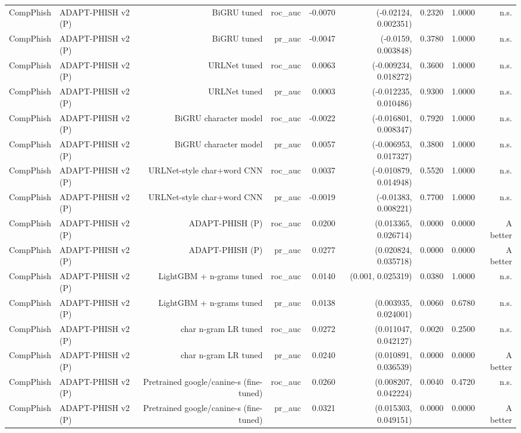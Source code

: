 \begin{table}[t]
\begin{tabular}{llrrrrrrr}
CompPhish & ADAPT-PHISH v2 (P) & BiGRU tuned & roc\_auc & -0.0070 & (-0.02124, 0.002351) & 0.2320 & 1.0000 & n.s. \\
CompPhish & ADAPT-PHISH v2 (P) & BiGRU tuned & pr\_auc & -0.0047 & (-0.0159, 0.003848) & 0.3780 & 1.0000 & n.s. \\
CompPhish & ADAPT-PHISH v2 (P) & URLNet tuned & roc\_auc & 0.0063 & (-0.009234, 0.018272) & 0.3600 & 1.0000 & n.s. \\
CompPhish & ADAPT-PHISH v2 (P) & URLNet tuned & pr\_auc & 0.0003 & (-0.012235, 0.010486) & 0.9300 & 1.0000 & n.s. \\
CompPhish & ADAPT-PHISH v2 (P) & BiGRU character model & roc\_auc & -0.0022 & (-0.016801, 0.008347) & 0.7920 & 1.0000 & n.s. \\
CompPhish & ADAPT-PHISH v2 (P) & BiGRU character model & pr\_auc & 0.0057 & (-0.006953, 0.017327) & 0.3800 & 1.0000 & n.s. \\
CompPhish & ADAPT-PHISH v2 (P) & URLNet-style char+word CNN & roc\_auc & 0.0037 & (-0.010879, 0.014948) & 0.5520 & 1.0000 & n.s. \\
CompPhish & ADAPT-PHISH v2 (P) & URLNet-style char+word CNN & pr\_auc & -0.0019 & (-0.01383, 0.008221) & 0.7700 & 1.0000 & n.s. \\
CompPhish & ADAPT-PHISH v2 (P) & ADAPT-PHISH (P) & roc\_auc & 0.0200 & (0.013365, 0.026714) & 0.0000 & 0.0000 & A better \\
CompPhish & ADAPT-PHISH v2 (P) & ADAPT-PHISH (P) & pr\_auc & 0.0277 & (0.020824, 0.035718) & 0.0000 & 0.0000 & A better \\
CompPhish & ADAPT-PHISH v2 (P) & LightGBM + n-grams tuned & roc\_auc & 0.0140 & (0.001, 0.025319) & 0.0380 & 1.0000 & n.s. \\
CompPhish & ADAPT-PHISH v2 (P) & LightGBM + n-grams tuned & pr\_auc & 0.0138 & (0.003935, 0.024001) & 0.0060 & 0.6780 & n.s. \\
CompPhish & ADAPT-PHISH v2 (P) & char n-gram LR tuned & roc\_auc & 0.0272 & (0.011047, 0.042127) & 0.0020 & 0.2500 & n.s. \\
CompPhish & ADAPT-PHISH v2 (P) & char n-gram LR tuned & pr\_auc & 0.0240 & (0.010891, 0.036539) & 0.0000 & 0.0000 & A better \\
CompPhish & ADAPT-PHISH v2 (P) & Pretrained google/canine-s (fine-tuned) & roc\_auc & 0.0260 & (0.008207, 0.042224) & 0.0040 & 0.4720 & n.s. \\
CompPhish & ADAPT-PHISH v2 (P) & Pretrained google/canine-s (fine-tuned) & pr\_auc & 0.0321 & (0.015303, 0.049151) & 0.0000 & 0.0000 & A better \\

\end{tabular}
\end{table}
